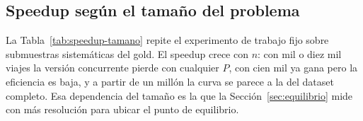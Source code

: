 \subsection{Speedup según el tamaño del problema}



La Tabla~\ref{tab:speedup-tamano} repite el experimento de trabajo fijo sobre submuestras
sistemáticas del gold. El speedup crece con $n$: con mil o diez mil viajes la versión concurrente
pierde con cualquier $P$, con cien mil ya gana pero la eficiencia es baja, y a partir de un millón
la curva se parece a la del dataset completo. Esa dependencia del tamaño es la que la
Sección~\ref{sec:equilibrio} mide con más resolución para ubicar el punto de equilibrio.
